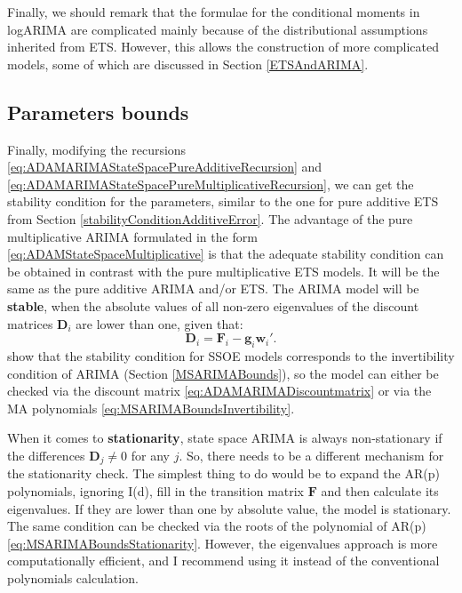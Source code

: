 \documentclass[
]{book}
\theoremstyle{definition}
\theoremstyle{definition}
\theoremstyle{definition}
\theoremstyle{definition}
\theoremstyle{remark}
\begin{document}
Finally, we should remark that the formulae for the conditional moments in logARIMA are complicated mainly because of the distributional assumptions inherited from ETS. However, this allows the construction of more complicated models, some of which are discussed in Section \ref{ETSAndARIMA}.

\hypertarget{parameters-bounds}{%
\subsection{Parameters bounds}\label{parameters-bounds}}

Finally, modifying the recursions \eqref{eq:ADAMARIMAStateSpacePureAdditiveRecursion} and \eqref{eq:ADAMARIMAStateSpacePureMultiplicativeRecursion}, we can get the stability condition for the parameters, similar to the one for pure additive ETS from Section \ref{stabilityConditionAdditiveError}. The advantage of the pure multiplicative ARIMA formulated in the form \eqref{eq:ADAMStateSpaceMultiplicative} is that the adequate stability condition can be obtained in contrast with the pure multiplicative ETS models. It will be the same as the pure additive ARIMA and/or ETS. The ARIMA model will be \textbf{stable}, when the absolute values of all non-zero eigenvalues of the discount matrices \(\mathbf{D}_{i}\) are lower than one, given that:
\begin{equation}
  \mathbf{D}_{i} = \mathbf{F}_{i} -\mathbf{g}_{i} \mathbf{w}_{i}' .
  \label{eq:ADAMARIMADiscountmatrix}
\end{equation}
\citet{Hyndman2008b} show that the stability condition for SSOE models corresponds to the invertibility condition of ARIMA (Section \ref{MSARIMABounds}), so the model can either be checked via the discount matrix \eqref{eq:ADAMARIMADiscountmatrix} or via the MA polynomials \eqref{eq:MSARIMABoundsInvertibility}.

When it comes to \textbf{stationarity}, state space ARIMA is always non-stationary if the differences \(\mathbf{D}_j \neq 0\) for any \(j\). So, there needs to be a different mechanism for the stationarity check. The simplest thing to do would be to expand the AR(p) polynomials, ignoring I(d), fill in the transition matrix \(\mathbf{F}\) and then calculate its eigenvalues. If they are lower than one by absolute value, the model is stationary. The same condition can be checked via the roots of the polynomial of AR(p) \eqref{eq:MSARIMABoundsStationarity}. However, the eigenvalues approach is more computationally efficient, and I recommend using it instead of the conventional polynomials calculation.
\end{document}
